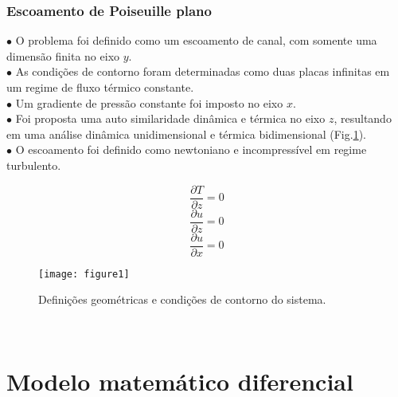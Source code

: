 \documentclass[xcolor=dvipsnames,10pt,aspectratio=169]{beamer}
\begin{document}
		\begin{frame}
			\frametitle{Escoamento de Poiseuille plano}
			$\bullet$ O problema foi definido como um escoamento de canal, com somente uma dimensão finita no eixo $y$. \\
			$\bullet$ As condições de contorno foram determinadas como duas placas infinitas em um regime de fluxo térmico constante.\\
			$\bullet$ Um gradiente de pressão constante foi imposto no eixo $x$.\\
			$\bullet$ Foi proposta uma auto similaridade dinâmica e térmica no eixo $z$, resultando em uma análise dinâmica unidimensional e térmica bidimensional (Fig.\ref{figure.1}). \\
			$\bullet$ O escoamento foi definido como newtoniano e incompressível em regime turbulento.\\
			\begin{minipage}[h!]{0.3\textwidth}
				\begin{equation*}
				 \frac{\partial T }{\partial z} = 0
				\end{equation*}
				\begin{equation*}
				\frac{\partial u }{\partial z} = 0
				\end{equation*}
				\begin{equation*}
				\frac{\partial u }{\partial x} = 0
				\end{equation*}
			\end{minipage}
			\begin{minipage}[h!]{0.5\textwidth}
			\begin{figure}[h!]
				\centering
				\texttt{[image: figure1]}
				\caption{Definições geométricas e condições de contorno do sistema.}
				\label{figure.1}
			\end{figure}
			\end{minipage}
			\\
		\end{frame}
	
	

	
	\section{Modelo matemático diferencial}
	
	
	
	
		
\end{document}

